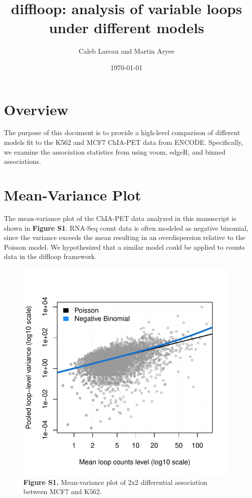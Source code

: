 \documentclass{article}\usepackage[]{graphicx}\usepackage[]{color}
\title{diffloop: analysis of variable loops under different models}
\author{Caleb Lareau and Martin Aryee}
\date{\today}
\makeatletter
\def\maxwidth{ %
  \ifdim\Gin@nat@width>\linewidth
    \linewidth
  \else
    \Gin@nat@width
  \fi
}
\newenvironment{knitrout}{}{} %
\makeatother
\begin{document}
\maketitle
\captionsetup[figure]{labelformat=empty}

\section*{Overview}
The purpose of this document is to provide a high-level comparison of different models fit to the K562 and MCF7 ChIA-PET data from ENCODE. Specifically, we examine the association statistics from using voom, edgeR, and binned associations. 

\section*{Mean-Variance Plot}
The mean-variance plot of the ChIA-PET data analyzed in this manuscript is shown in \textbf{Figure S1}. RNA-Seq count data is often modeled as negative binomial, since the variance exceeds the mean resulting in an overdispersion relative to the Poisson model. We hypothesized that a similar model could be applied to counts data in the diffloop framework. 

\begin{figure}[h]
\begin{knitrout}
\color{fgcolor}

{\centering \includegraphics[width=\maxwidth]{figure/mvPlot-1} 

}



\end{knitrout}
\centering
\caption{\textbf{Figure S1.} Mean-variance plot of 2x2 differential association between MCF7 and K562.}
\end{figure} \newpage
\end{document}
